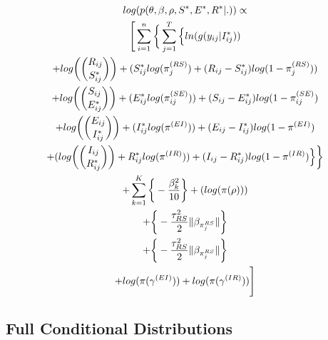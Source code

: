 \documentclass[12pt]{article}
\begin{document}
\begin{center}
\begin{multline}
\displaystyle
log(p(\theta,\beta,\rho,S^*,E^*,R^*|.)) \propto \\
\Bigg[ \sum_{i=1}^n \bigg\{ \sum_{j=1}^T
        \Big\{
            ln(g(y_{ij}|I^*_{ij})) \\ 
            + log\bigg(\dbinom{R_{ij}}{S^*_{ij}}\bigg) + (S^*_{ij}log(\pi_j^{(RS)}) + (R_{ij} - S^*_{ij})log(1-\pi_j^{(RS)})) \\
            + log\bigg(\dbinom{S_{ij}}{E^*_{ij}}\bigg) + (E^*_{ij}log(\pi_{ij}^{(SE)})) + (S_{ij} - E^*_{ij})log(1-\pi_{ij}^{(SE)}) \\
            + log\bigg(\dbinom{E_{ij}}{I^*_{ij}}\bigg) + (I^*_{ij}log(\pi^{(EI)})) + (E_{ij} - I^*_{ij})log(1-\pi^{(EI)}) \\
            + (log\bigg(\dbinom{I_{ij}}{R^*_{ij}}\bigg) + R^*_{ij}log(\pi^{(IR)})) + (I_{ij} - R^*_{ij})log(1-\pi^{(IR)}) \Big\}\bigg\} \\
    + \sum_{k = 1}^K\bigg\{-\frac{\beta^2_k}{10}\bigg\}
            + (log(\pi(\rho)))\\
            +  \bigg\{ -\frac{\tau^2_{RS}}{2}\|\beta_{\pi_j^{RS}}\|  \bigg\} \\ 
            + \bigg\{ -\frac{\tau^2_{RS}}{2}\|\beta_{\pi_j^{RS}}\|  \bigg\} \\ 
            + log(\pi(\gamma^{(EI)})) + log(\pi(\gamma^{(IR)}))\Bigg]\\
\end{multline}
\end{center}

\subsection{Full Conditional Distributions}
\end{document}
